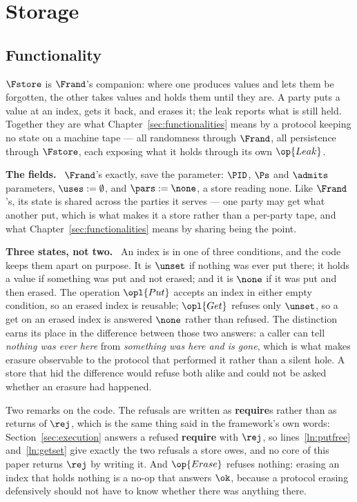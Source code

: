 \documentclass[10pt,oneside,openany]{book}
\newcommand{\heading}[1]{\medskip\par\noindent\textcolor{accent}{\textbf{#1.}}\ }
\theoremstyle{accentdef}
\theoremstyle{accentplain}
\begin{document}
\chapter{Storage}\label{sec:fstore}

\section{Functionality}\label{sec:fstorefunc}

$\Fstore$ is $\Frand$'s companion: where one produces values and lets them be forgotten, the other
takes values and holds them until they are. A party puts a value at an index, gets it back, and
erases it; the leak reports what is still held. Together they are what
Chapter~\ref{sec:functionalities} means by a protocol keeping no state on a machine tape --- all
randomness through $\Frand$, all persistence through $\Fstore$, each exposing what it holds
through its own $\op{Leak}$.

\heading{The fields} $\Frand$'s exactly, save the parameter: $\PID$, $\Ps$ and $\admits$
parameters, $\uses := \emptyset$, and $\pars := \none$, a store reading none. Like $\Frand$'s, its
state is shared across the parties it serves --- one party may get what another put, which is what
makes it a store rather than a per-party tape, and what
Chapter~\ref{sec:functionalities} means by sharing being the point.

\heading{Three states, not two} An index is in one of three conditions, and the code keeps them
apart on purpose. It is $\unset$ if nothing was ever put there; it holds a value if something was
put and not erased; and it is $\none$ if it was put and then erased. The operation $\opl{Put}$ accepts an index
in either empty condition, so an erased index is reusable; $\opl{Get}$ refuses only $\unset$, so a
get on an erased index is answered $\none$ rather than refused. The distinction earns its place
in the difference between those two answers: a caller can tell \emph{nothing was ever here} from
\emph{something was here and is gone}, which is what makes erasure observable to the protocol that
performed it rather than a silent hole. A store that hid the difference would refuse both alike
and could not be asked whether an erasure had happened.



Two remarks on the code. The refusals are written as \textbf{require}s rather than as returns of
$\rej$, which is the same thing said in the framework's own words: Section~\ref{sec:execution}
answers a refused \textbf{require} with $\rej$, so lines~\ref{ln:putfree} and~\ref{ln:getset} give
exactly the two refusals a store owes, and no core of this paper returns $\rej$ by writing it. And
$\op{Erase}$ refuses nothing: erasing an index that holds nothing is a no-op that answers $\ok$,
because a protocol erasing defensively should not have to know whether there was anything there.
\end{document}
